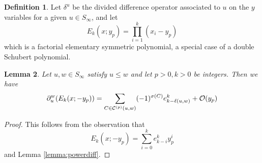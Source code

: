 \documentclass[a4paper,fleqn]{cas-sc}
\newtheorem{lemma}{Lemma}[subsection]
\theoremstyle{definition}
\newtheorem{definition}[lemma]{Definition}
\theoremstyle{remark}
\numberwithin{equation}{subsection}
\begin{document}
\begin{definition}
Let $\delta^u$ be the divided difference operator associated to $u$ on the $y$ variables for a given $u\in S_\infty$, and let 
$$E_k(x;y_p)=\prod_{i=1}^k (x_i - y_p)$$
which is a factorial elementary symmetric polynomial, a special case of a double Schubert polynomial.
\end{definition}

\begin{lemma} \label{lemma:doublediff}
  Let $u,w\in S_\infty$ satisfy $u\leq w$ and let $p>0,k>0$ be integers. Then we have
  $$\partial_u^w(E_k(x;-y_p))=\sum_{C\in\mathcal{C}^{(p)}(u,w)}(-1)^{\sigma(C)}e_{k-\ell(u,w)}^k+\mathcal{O}(y_p)$$
\end{lemma}

\begin{proof}
This follows from the observation that
$$E_k(x;-y_p) = \sum_{i=0}^k e_{k-i}^k y_p^i$$
and Lemma \ref{lemma:powerdiff}.
\end{proof}
\end{document}
